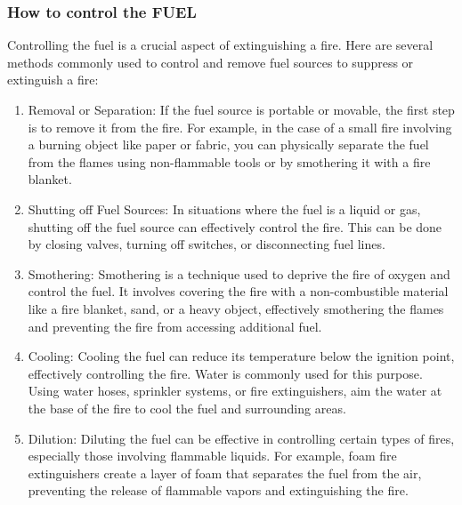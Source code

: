 \documentclass{article}
\begin{document}
\subsubsection*{How to control the FUEL}
Controlling the fuel is a crucial aspect of extinguishing a fire. Here are several methods commonly used to control and remove fuel sources to suppress or extinguish a fire:
\begin{enumerate}
  \item Removal or Separation: If the fuel source is portable or movable, the first step is to remove it from the fire. For example, in the case of a small fire involving a burning object like paper or fabric, you can physically separate the fuel from the flames using non-flammable tools or by smothering it with a fire blanket.
  \item Shutting off Fuel Sources: In situations where the fuel is a liquid or gas, shutting off the fuel source can effectively control the fire. This can be done by closing valves, turning off switches, or disconnecting fuel lines.
  \item Smothering: Smothering is a technique used to deprive the fire of oxygen and control the fuel. It involves covering the fire with a non-combustible material like a fire blanket, sand, or a heavy object, effectively smothering the flames and preventing the fire from accessing additional fuel.
  \item Cooling: Cooling the fuel can reduce its temperature below the ignition point, effectively controlling the fire. Water is commonly used for this purpose. Using water hoses, sprinkler systems, or fire extinguishers, aim the water at the base of the fire to cool the fuel and surrounding areas.
  \item Dilution: Diluting the fuel can be effective in controlling certain types of fires, especially those involving flammable liquids. For example, foam fire extinguishers create a layer of foam that separates the fuel from the air, preventing the release of flammable vapors and extinguishing the fire.
\end{enumerate}
\end{document}
